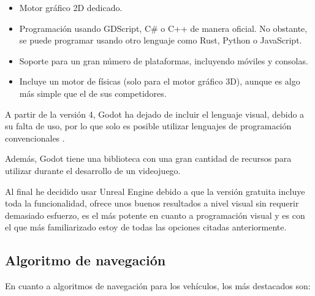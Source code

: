 \documentclass[a4paper,11pt]{book}
\begin{document}
\begin{itemize}
   \item Motor gráfico 2D dedicado. 
   \item Programación usando GDScript, C\# o C++ de manera oficial. No obstante, se puede programar usando otro lenguaje como Rust, Python o JavaScript. 
   \item Soporte para un gran número de plataformas, incluyendo móviles y consolas.
   \item Incluye un motor de físicas (solo para el motor gráfico 3D), aunque es algo más simple que el de sus competidores.
\end{itemize}

\bigskip 

A partir de la versión 4, Godot ha dejado de incluir el lenguaje visual, debido a su falta de uso, por lo que solo es posible utilizar lenguajes de programación convencionales \cite{godot-no-visual}.

\bigskip

Además, Godot tiene una biblioteca con una gran cantidad de recursos para utilizar durante el desarrollo de un videojuego.


\bigskip

Al final he decidido usar Unreal Engine debido a que la versión gratuita incluye toda la funcionalidad, ofrece unos buenos resultados a nivel visual sin requerir demasiado esfuerzo, es el más potente en cuanto a programación visual y es con el que más familiarizado estoy de todas las opciones citadas anteriormente.

\subsection{Algoritmo de navegación}
En cuanto a algoritmos de navegación para los vehículos, los más destacados son:
\end{document}
